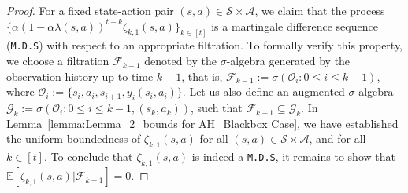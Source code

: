 \documentclass{article}
\newcommand{\mc}{\mathcal}
\begin{document}
\begin{proof}
  For a fixed state-action pair \((s,a) \in \mathcal{S} \times \mathcal{A}\), we claim that the process \(\{\alpha (1 - \alpha \lambda(s,a))^{t - k} \zeta_{k,1}(s,a)\}_{k \in [t]}\) is a martingale difference sequence (\texttt{M.D.S}) with respect to an appropriate filtration. To formally verify this property, we choose a filtration \(\mathcal{F}_{k-1}\) denoted by the \(\sigma\)-algebra generated by the observation history up to time \(k-1\), that is, \(\mathcal{F}_{k-1} := \sigma(\mathcal{O}_i : 0 \leq i \leq k-1)\), where \(\mathcal{O}_i := \{s_i, a_i, s_{i+1}, y_i(s_i,a_i)\}\). Let us also define an augmented \(\sigma\)-algebra \(\mathcal{G}_k := \sigma(\mathcal{O}_i : 0 \leq i \leq k-1, (s_k, a_k))\), such that \(\mathcal{F}_{k-1} \subseteq \mathcal{G}_k\). In Lemma~\ref{lemma:Lemma_2_bounds for AH_Blackbox Case}, we have established the uniform boundedness of \(\zeta_{k,1}(s,a)\) for all \((s,a) \in \mc{S} \times \mc{A}\), and for all \(k \in [t]\). To conclude that \(\zeta_{k,1}(s,a)\) is indeed a \texttt{M.D.S}, it remains to show that \(\mathbb{E}[\zeta_{k,1}(s,a) \lvert \mathcal{F}_{k-1}] = 0\). 
  

\end{proof}
\end{document}
